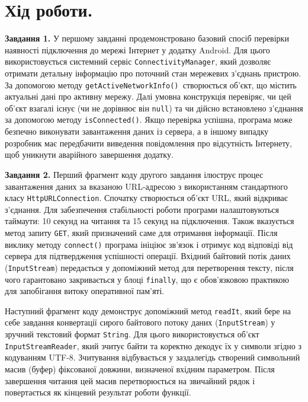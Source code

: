 \documentclass[14pt, a4paper]{extreport}
\begin{document}
	\pagebreak
	
	\section*{Хід роботи.}
	
	\textbf{Завдання 1.} У першому завданні продемонстровано базовий спосіб перевірки наявності підключення до мережі Інтернет у додатку Android. Для цього використовується системний сервіс \texttt{ConnectivityManager}, який дозволяє отримати детальну інформацію про поточний стан мережевих з'єднань пристрою. За допомогою методу \texttt{getActiveNetworkInfo() }створюється об'єкт, що містить актуальні дані про активну мережу. Далі умовна конструкція перевіряє, чи цей об'єкт взагалі існує (чи не дорівнює він \texttt{null}) та чи дійсно встановлено з'єднання за допомогою методу \texttt{isConnected()}. Якщо перевірка успішна, програма може безпечно виконувати завантаження даних із сервера, а в іншому випадку розробник має передбачити виведення повідомлення про відсутність Інтернету, щоб уникнути аварійного завершення додатку.
	
	\textbf{Завдання 2.} Перший фрагмент коду другого завдання ілюструє процес завантаження даних за вказаною URL-адресою з використанням стандартного класу \texttt{HttpURLConnection}. Спочатку створюється об'єкт URL, який відкриває з'єднання. Для забезпечення стабільності роботи програми налаштовуються таймаути: 10 секунд на читання та 15 секунд на підключення. Також вказується метод запиту \texttt{GET}, який призначений саме для отримання інформації. Після виклику методу \texttt{connect()} програма ініціює зв'язок і отримує код відповіді від сервера для підтвердження успішності операції. Вхідний байтовий потік даних (\texttt{InputStream}) передається у допоміжний метод для перетворення тексту, після чого гарантовано закривається у блоці \texttt{finally}, що є обов'язковою практикою для запобігання витоку оперативної пам'яті.
	
	Наступний фрагмент коду демонструє допоміжний метод \texttt{readIt}, який бере на себе завдання конвертації сирого байтового потоку даних (\texttt{InputStream}) у зручний текстовий формат \texttt{String}. Для цього використовується об'єкт \texttt{InputStreamReader}, який зчитує байти та коректно декодує їх у символи згідно з кодуванням UTF-8. Зчитування відбувається у заздалегідь створений символьний масив (буфер) фіксованої довжини, визначеної вхідним параметром. Після завершення читання цей масив перетворюється на звичайний рядок і повертається як кінцевий результат роботи функції.
	
\end{document}

